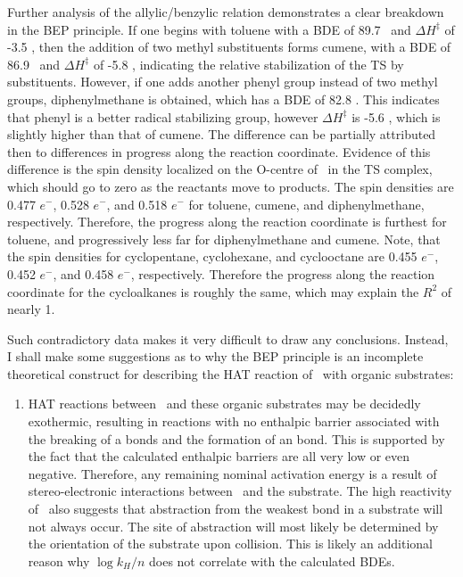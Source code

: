 \begin{doublespace}
Further analysis of the allylic/benzylic relation demonstrates a clear breakdown
in the BEP principle. If one begins with toluene with a BDE of 89.7 \kcalmol\
and $\Delta H^\ddagger$ of -3.5 \kcalmol, then the addition of two methyl
substituents forms cumene, with a BDE of 86.9 \kcalmol\ and $\Delta H^\ddagger$
of -5.8 \kcalmol, indicating the relative stabilization of the TS by
substituents. However, if one adds another phenyl group instead of two methyl
groups, diphenylmethane is obtained, which has a BDE of 82.8 \kcalmol. This
indicates that phenyl is a better radical stabilizing group, however $\Delta
H^\ddagger$ is -5.6 \kcalmol, which is slightly higher than that of cumene. The
difference can be partially attributed then to differences in progress along the
reaction coordinate. Evidence of this difference is the spin density localized
on the O-centre of \cumo\ in the TS complex, which should go to zero as the
reactants move to products. The \ch{O^.} spin densities are 0.477 $e^-$, 0.528
$e^-$, and 0.518 $e^-$ for toluene, cumene, and diphenylmethane, respectively.
Therefore, the progress along the reaction coordinate is furthest for toluene,
and progressively less far for diphenylmethane and cumene. Note, that the
\ch{O^.} spin densities for cyclopentane, cyclohexane, and cyclooctane are 0.455
$e^-$, 0.452 $e^-$, and 0.458 $e^-$, respectively. Therefore the progress along
the reaction coordinate for the cycloalkanes is roughly the same, which may
explain the $R^2$ of nearly 1.

Such contradictory data makes it very difficult to draw any conclusions.
Instead, I shall make some suggestions as to why the BEP principle is an
incomplete theoretical construct for describing the HAT reaction of \cumo\ with
organic substrates:

\begin{enumerate}
  \item HAT reactions between \cumo\ and these organic substrates may be
  decidedly exothermic, resulting in reactions with no enthalpic barrier
  associated with the breaking of a \ch{C-H} bonds and the formation of an
  \ch{O-H} bond. This is supported by the fact that the calculated enthalpic
  barriers are all very low or even negative. Therefore, any remaining nominal
  activation energy is a result of stereo-electronic interactions between \cumo\
  and the substrate. The high reactivity of \cumo\ also suggests that
  abstraction from the weakest bond in a substrate will not always occur.  The
  site of abstraction will most likely be determined by the orientation of the
  substrate upon collision. This is likely an additional reason why
  $\log{k_H/n}$ does not correlate with the calculated \ch{C-H} BDEs.


\end{enumerate}
\end{doublespace}
